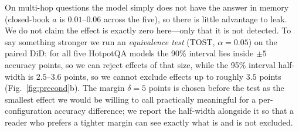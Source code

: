 \documentclass[11pt]{article}
\begin{document}
On multi-hop questions the model simply does not have the answer in memory
(closed-book $a$ is $0.01$--$0.06$ across the five), so there is little advantage to leak. We do
not claim the effect
is exactly zero here---only that it is not detected. To say something stronger we run an
\emph{equivalence test} (TOST, $\alpha{=}0.05$) on the paired DiD: for all five HotpotQA
models the 90\% interval lies inside $\pm 5$ accuracy points, so we can reject effects of
that size, while the 95\% interval half-width is $2.5$--$3.6$ points, so we cannot exclude
effects up to roughly $3.5$ points (Fig.~\ref{fig:precond}b). The margin $\delta{=}5$ points
is chosen before the test as the smallest effect we would be willing to call practically
meaningful for a per-configuration accuracy difference; we report the
half-width alongside it so that a reader who prefers a tighter margin can see exactly what
is and is not excluded.
\end{document}
